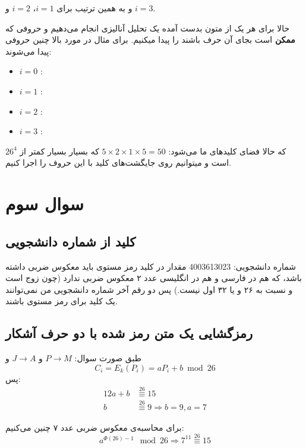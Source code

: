 \documentclass{article}
\newcommand{\modts}{\overset{26}{\equiv}}
\begin{document}
\begin{enumerate}
و به همین ترتیب برای 
$i = 1$،
$i = 2$ و
$i = 3$.

حالا برای هر یک از متون بدست آمده یک تحلیل آنالیزی انجام می‌دهیم و حروفی که \textbf{ممکن} است بجای آن حرف باشند را پیدا میکنیم.
برای مثال در مورد بالا چنین حروفی پیدا می‌شوند:
\begin{itemize}
\item $i = 0$ :  
\item $i = 1$ : 
\item $i = 2$ : 
\item $i = 3$ : 
\end{itemize}

که حالا فضای کلید‌های ما می‌شود:
$5 \times 2 \times 1 \times 5 = 50$
که بسیار بسیار کمتر از 
$26^4$
است و میتوانیم روی جایگشت‌های کلید با این حروف 
را اجرا کنیم.
\end{enumerate}

\section{سوال سوم}
\subsection{کلید از شماره دانشجویی}
شماره دانشجویی:
4003613023
مقدار  در کلید رمز مستوی باید معکوس ضربی داشته باشد، که هم در فارسی و هم در انگلیسی عدد ۲ معکوس ضربی ندارد (چون زوج است و نسبت به ۲۶ و یا ۳۲ اول نیست.) پس دو رقم آخر شماره دانشجویی من نمی‌توانند یک کلید برای رمز مستوی باشند.

\subsection{رمزگشایی یک متن رمز شده با دو حرف آشکار}
طبق صورت سوال: $P \rightarrow M$ و 
$J \rightarrow A$
و
\begin{equation}
C_i = E_k(P_i) = aP_i + b \bmod{26}
\end{equation}
پس:
\begin{equation*}
\begin{split}
12a + b & \modts 15 \\
b & \modts 9 \Rightarrow b = 9, a = 7
\end{split}
\end{equation*}

برای محاسبه‌‌ی معکوس ضربی عدد ۷ چنین می‌کنیم:
\begin{equation*}
a^{\Phi(26) - 1} \mod 26 \Rightarrow 7^{11} \modts 15
\end{equation*}
\end{document}
